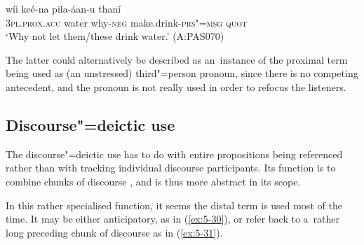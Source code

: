 \begin{exe}
\ex
\label{ex:5-29}
\gll [aniaám] wíi keé-na pila-áan-u thaní \\
\textsc{3pl.prox.acc} water why-\textsc{neg} make.drink-\textsc{prs"=msg} \textsc{quot}\\
\glt `Why not let them/these drink water.' (A:PAS070)
\end{exe}
The latter could alternatively be described as an~instance of the proximal term being used as (an unstressed) third"=person pronoun, since there is no competing antecedent, and the pronoun is not really used in order to refocus the listeners.

\subsection{Discourse"=deictic use}
\label{subsec:5-2-5}

The discourse"=deictic use has to do with entire propositions being referenced rather than with tracking individual discourse participants. Its function is to combine chunks of discourse \citep[432]{diessel2006}, and is thus more abstract in its scope.



In this rather specialised function, it seems the distal term is used most of the time. It may be either anticipatory, as in (\ref{ex:5-30}), or refer back to a~rather long preceding chunk of discourse as in (\ref{ex:5-31}).

